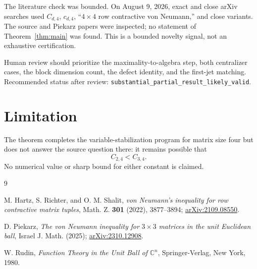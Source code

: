 \documentclass[11pt]{article}
\theoremstyle{remark}
\newcommand{\C}{\mathbb C}
\begin{document}
The literature check was bounded.  On August 9, 2026, exact and close arXiv
searches used $C_{d,4}$, $c_{d,4}$, ``$4\times4$ row contractive von
Neumann,'' and close variants.  The source and Piekarz papers were inspected;
no statement of Theorem~\ref{thm:main} was found.  This is a bounded novelty
signal, not an exhaustive certification.

Human review should prioritize the maximality-to-algebra step, both
centralizer cases, the block dimension count, the defect identity, and the
first-jet matching.  Recommended status after review:
\texttt{substantial\_partial\_result\_likely\_valid}.

\section{Limitation}

The theorem completes the variable-stabilization program for matrix size
four but does not answer the source question there: it remains possible that
\[
 C_{2,4}<C_{3,4}.
\]
No numerical value or sharp bound for either constant is claimed.

\begin{thebibliography}{9}

M. Hartz, S. Richter, and O. M. Shalit,
\emph{von Neumann's inequality for row contractive matrix tuples},
Math. Z. \textbf{301} (2022), 3877--3894;
\href{https://arxiv.org/abs/2109.08550}{arXiv:2109.08550}.

D. Piekarz,
\emph{The von Neumann inequality for $3\times3$ matrices in the unit
Euclidean ball},
Israel J. Math. (2025);
\href{https://arxiv.org/abs/2310.12908}{arXiv:2310.12908}.

W. Rudin,
\emph{Function Theory in the Unit Ball of $\C^n$},
Springer-Verlag, New York, 1980.

\end{thebibliography}
\end{document}
